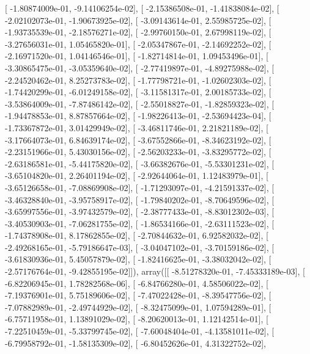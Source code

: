 \documentclass{article}
\begin{document}
       [ -1.80874009e-01,  -9.14106254e-02],
       [ -2.15386508e-01,  -1.41838084e-02],
       [ -2.02102073e-01,  -1.90673925e-02],
       [ -3.09143614e-01,   2.55985725e-02],
       [ -1.93735539e-01,  -2.18576271e-02],
       [ -2.99760150e-01,   2.67998119e-02],
       [ -3.27656031e-01,   1.05465820e-01],
       [ -2.05347867e-01,  -2.14692252e-02],
       [ -2.16971520e-01,   1.04146546e-01],
       [ -1.82714814e-01,   1.09453496e-01],
       [ -3.30865475e-01,  -3.05359640e-02],
       [ -2.77419897e-01,  -4.89275988e-02],
       [ -2.24520462e-01,   8.25273783e-02],
       [ -1.77798721e-01,  -1.02602303e-02],
       [ -1.74420299e-01,  -6.01249158e-02],
       [ -3.11581317e-01,   2.00185733e-02],
       [ -3.53864009e-01,  -7.87486142e-02],
       [ -2.55018827e-01,  -1.82859323e-02],
       [ -1.94478853e-01,   8.87857664e-02],
       [ -1.98226413e-01,  -2.53694423e-04],
       [ -1.73367872e-01,   3.01429949e-02],
       [ -3.46811746e-01,   2.21821189e-02],
       [ -3.17664073e-01,   6.84639174e-02],
       [ -3.67552866e-01,  -8.34623192e-02],
       [ -2.23151966e-01,   5.43030156e-02],
       [ -2.56203233e-01,  -3.83295772e-02],
       [ -2.63186581e-01,  -5.44175820e-02],
       [ -3.66382676e-01,  -5.53301231e-02],
       [ -3.65104820e-01,   2.26401194e-02],
       [ -2.92644064e-01,   1.12483979e-01],
       [ -3.65126658e-01,  -7.08869908e-02],
       [ -1.71293097e-01,  -4.21591337e-02],
       [ -3.46328840e-01,  -3.95758917e-02],
       [ -1.79840202e-01,  -8.70649596e-02],
       [ -3.65997556e-01,  -3.97432579e-02],
       [ -2.38777433e-01,  -8.83012302e-03],
       [ -3.40530903e-01,  -7.06281755e-02],
       [ -1.86534166e-01,  -2.63111523e-02],
       [ -1.74378908e-01,   8.17862855e-02],
       [ -2.70844632e-01,   6.92582032e-02],
       [ -2.49268165e-01,  -5.79186647e-03],
       [ -3.04047102e-01,  -3.70159186e-02],
       [ -3.61830936e-01,   5.45057879e-02],
       [ -1.82416625e-01,  -3.38032042e-02],
       [ -2.57176764e-01,  -9.42855195e-02]]), array([[ -8.51278320e-01,  -7.45333189e-03],
       [ -6.82206945e-01,   1.78282568e-06],
       [ -6.84766280e-01,   4.58506022e-02],
       [ -7.19376901e-01,   5.75189606e-02],
       [ -7.47022428e-01,  -8.39547756e-02],
       [ -7.07882989e-01,  -2.49744929e-02],
       [ -8.32475099e-01,   1.07594289e-01],
       [ -6.75711958e-01,   1.13891029e-02],
       [ -8.20620013e-01,   1.12142514e-01],
       [ -7.22510459e-01,  -5.33799745e-02],
       [ -7.60048404e-01,  -4.13581011e-02],
       [ -6.79958792e-01,  -1.58135309e-02],
       [ -6.80452626e-01,   4.31322752e-02],
\end{document}
